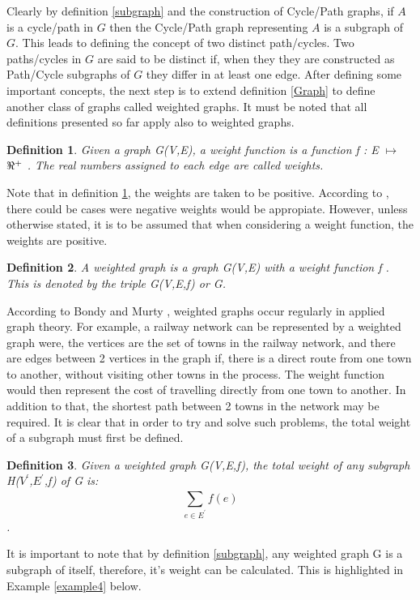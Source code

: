 \documentclass[12pt]{article}
\newtheorem{definition}{Definition}[subsection]
\numberwithin{equation}{subsection}
\numberwithin{table}{subsection}
\begin{document}
Clearly by definition \ref{subgraph} and the construction of Cycle/Path graphs, if $A$ is a cycle/path in $G$ then the Cycle/Path graph representing $A$ is a subgraph of $G$. This leads to defining the concept of two distinct path/cycles. Two paths/cycles in $G$ are said to be distinct if, when they they are constructed as Path/Cycle subgraphs of $G$ they differ in at least one edge. After defining some important concepts, the next step is to extend definition \ref{Graph} to define another class of graphs called weighted graphs. It must be noted that all definitions presented so far apply also to weighted graphs.
\begin{definition}
\label{Weighted Function}
Given a graph G(V,E), a weight function is a function f : E $\mapsto$ $\real^+$ {}. The real numbers assigned to each edge are called weights.
\end{definition}
Note that in definition \ref{Weighted Function}, the weights are taken to be positive. According to \cite{harris_hirst_mossinghoff_2008}, there could be cases were negative weights would be appropiate. However, unless otherwise stated, it is to be assumed that when considering a weight function, the weights are positive.
\begin{definition}
\label{Weighted Graph}
A weighted graph is a graph G(V,E) with a weight function f {}. This is denoted by the triple G(V,E,f) or G. 
\end{definition}
According to Bondy and Murty \cite{bondy_murty_1982}, weighted graphs occur regularly in applied graph theory. For example, a railway network can be represented by a weighted graph were, the vertices are the set of towns in the railway network, and there are edges between 2 vertices in the graph if, there is a direct route from one town to another, without visiting other towns in the process. The weight function would then represent the cost of travelling directly from one town to another. In addition to that, the shortest path between 2 towns in the network may be required. It is clear that in order to try and solve such problems, the total weight of a subgraph must first be defined.
\begin{definition}
\label{weightofasubgraph}
Given a weighted graph G(V,E,f), the total weight of any subgraph  H($V^\prime$,$E^\prime$,f) of G is: $$\sum_{e \in E^\prime}^{} f(e) $$. 
\end{definition}
It is important to note that by definition \ref{subgraph}, any weighted graph G is a subgraph of itself, therefore, it's weight can be calculated. This is highlighted in Example \ref{example4} below.
\end{document}
